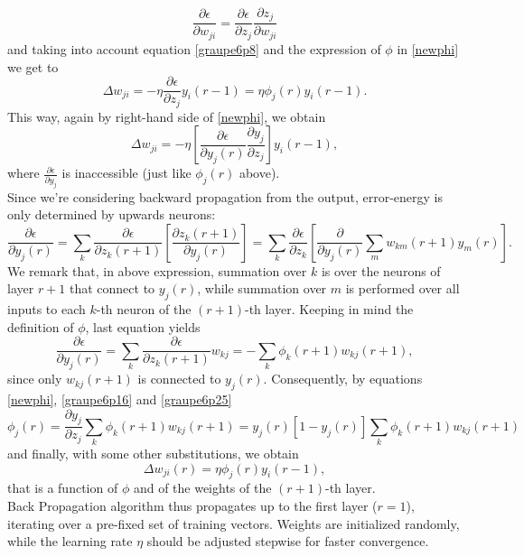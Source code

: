 \documentclass[%
    corpo=11pt,
    twoside,
    stile=classica,
    oldstyle,
    autoretitolo,
    tipotesi=magistrale,
    greek,
    evenboxes,
    english
]{toptesi}
\begin{document}
\begin{equation}
\frac{\partial \epsilon}{\partial w_{ji}} = \frac{\partial \epsilon}{\partial z_j} \frac{\partial z_j}{\partial w_{ji}}
\end{equation}
and taking into account equation \ref{graupe6p8} and the expression of $\phi$ in \ref{newphi} we get to
\begin{equation}
\Delta w_{ji} = -\eta \frac{\partial \epsilon}{\partial z_j} y_i (r-1) = \eta \phi_j(r)y_i(r-1).
\end{equation}
This way, again by right-hand side of \ref{newphi}, we obtain
\begin{equation}
\Delta w_{ji} = -\eta \left[ \frac{\partial \epsilon}{\partial y_j (r)} \frac{\partial y_j}{\partial z_j} \right]y_i(r-1),
\end{equation}
where $\frac{\partial \epsilon}{\partial y_j}$ is inaccessible (just like $\phi_j (r)$ above). \\
Since we're considering backward propagation from the output, error-energy is only determined by upwards neurons:
\begin{equation}
\frac{\partial \epsilon}{\partial y_j (r)} = \sum_k \frac{\partial \epsilon}{\partial z_k (r+1)} \left[\frac{\partial z_k (r+1)}{\partial y_j (r)} \right] = \sum_k \frac{\partial \epsilon}{\partial z_k} \left[ \frac{\partial}{\partial y_j(r)} \sum_m w_{km}(r+1)y_m(r)\right].
\end{equation}
We remark that, in above expression, summation over $k$ is over the neurons of layer $r+1$ that connect to $y_j(r)$, while summation over $m$ is performed over all inputs to each $k$-th neuron of the $(r+1)$-th layer. Keeping in mind the definition of $\phi$, last equation yields
\begin{equation} 
\label{graupe6p25}
\frac{\partial \epsilon}{\partial y_j (r)}  = \sum_k \frac{\partial \epsilon}{\partial z_k (r+1)}w_{kj} = - \sum_k \phi_k(r+1)w_{kj}(r+1),
\end{equation}
since only $w_{kj}(r+1)$ is connected to $y_j(r)$. Consequently, by equations \ref{newphi}, \ref{graupe6p16} and \ref{graupe6p25}
\begin{equation}
\phi_j(r) = \frac{\partial y_j}{\partial z_j}\sum_k \phi_k(r+1)w_{kj}(r +1) = y_j(r)\left[1 -y_j(r)\right]\sum_k \phi_k(r+1)w_{kj}(r +1)
\end{equation}
and finally, with some other substitutions, we obtain
\begin{equation}
\Delta w_{ji}(r) = \eta \phi_j(r)y_i(r-1),
\end{equation}
that is a function of $\phi$ and of the weights of the $(r + 1)$-th layer. \\
Back Propagation algorithm thus propagates up to the first layer ($r = 1$), iterating over a pre-fixed set of training vectors. Weights are initialized randomly, while the learning rate $\eta$ should be adjusted stepwise for faster convergence.
\end{document}
